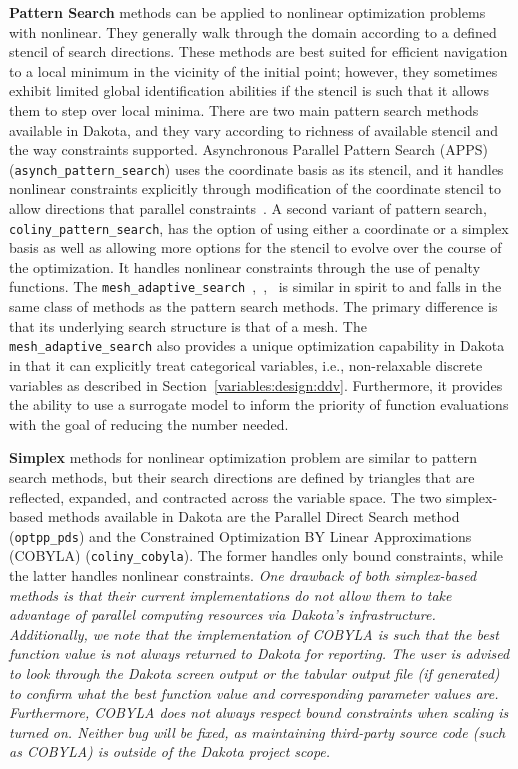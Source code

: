 {\bf Pattern Search} methods can be applied to nonlinear optimization
problems with nonlinear.  They generally walk through the domain
according to a defined stencil of search directions.  These methods
are best suited for efficient navigation to a local minimum in the
vicinity of the initial point; however, they sometimes exhibit limited
global identification abilities if the stencil is such that it allows
them to step over local minima.  There are two main pattern search
methods available in Dakota, and they vary according to richness of
available stencil and the way constraints supported.  Asynchronous
Parallel Pattern Search (APPS)~\cite{GrKo06}
(\texttt{asynch\_pattern\_search}) uses the coordinate basis as its
stencil, and it handles nonlinear constraints explicitly through
modification of the coordinate stencil to allow directions that
parallel constraints~\cite{GrKo07}.  A second variant of pattern
search, \texttt{coliny\_pattern\_search}, has the option of using
either a coordinate or a simplex basis as well as allowing more
options for the stencil to evolve over the course of the optimization.
It handles nonlinear constraints through the use of penalty functions.
The
\texttt{mesh\_adaptive\_search}~\cite{AuLeTr09a},~\cite{Nomad},~\cite{Le2011a}
is similar in spirit to and falls in the same class of methods as the
pattern search methods.  The primary difference is that its underlying
search structure is that of a mesh.  The
\texttt{mesh\_adaptive\_search} also provides a unique optimization
capability in Dakota in that it can explicitly treat categorical
variables, i.e., non-relaxable discrete variables as described in
Section~\ref{variables:design:ddv}.  Furthermore, it provides the
ability to use a surrogate model to inform the priority of function
evaluations with the goal of reducing the number needed.

{\bf Simplex} methods for nonlinear optimization problem are similar
to pattern search methods, but their search directions are defined by
triangles that are reflected, expanded, and contracted across the
variable space.  The two simplex-based methods available in Dakota are
the Parallel Direct Search method~\cite{Den94b} (\texttt{optpp\_pds})
and the Constrained Optimization BY Linear Approximations (COBYLA)
(\texttt{coliny\_cobyla}).  The former handles only bound constraints,
while the latter handles nonlinear constraints.  \emph{One drawback of
  both simplex-based methods is that their current implementations do
  not allow them to take advantage of parallel computing resources via
  Dakota's infrastructure.  Additionally, we note that the
  implementation of COBYLA is such that the best function value is not
  always returned to Dakota for reporting.  The user is advised to
  look through the Dakota screen output or the tabular output file (if
  generated) to confirm what the best function value and corresponding
  parameter values are.  Furthermore, COBYLA does not always respect
  bound constraints when scaling is turned on.  Neither bug will be
  fixed, as maintaining third-party source code (such as COBYLA) is
  outside of the Dakota project scope.}

